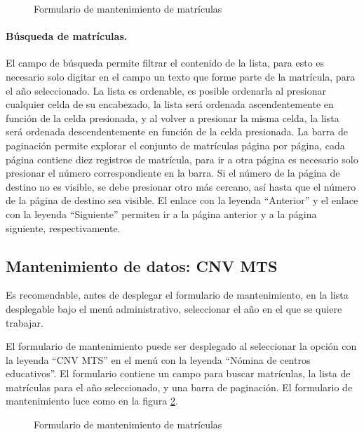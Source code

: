 \documentclass[a4paper, 9pt, conference]{article}              %
\begin{document}
\begin{figure}
	\centering
		\caption{Formulario de mantenimiento de matr\'iculas}
	\label{fig:geoenrollments3}
\end{figure}


\paragraph{B\'usqueda de matr\'iculas.}

El campo de b\'usqueda permite filtrar el contenido de la lista, para esto es necesario solo digitar en el campo un texto que forme parte de la matr\'icula, para el a\~no seleccionado. La lista es ordenable, es posible ordenarla al presionar cualquier celda de su encabezado, la lista ser\'a ordenada ascendentemente en funci\'on de la celda presionada, y al volver a presionar la misma celda, la lista ser\'a ordenada descendentemente en funci\'on de la celda presionada. La barra de paginaci\'on permite explorar el conjunto de matr\'iculas p\'agina por p\'agina, cada p\'agina contiene diez registros de matr\'icula, para ir a otra p\'agina es necesario solo presionar el n\'umero correspondiente en la barra. Si el n\'umero de la p\'agina de destino no es visible, se debe presionar otro m\'as cercano, as\'i hasta que el n\'umero de la p\'agina de destino sea visible. El enlace con la leyenda ``Anterior'' y el enlace con la leyenda ``Siguiente'' permiten ir a la p\'agina anterior y a la p\'agina siguiente, respectivamente.


\subsection{Mantenimiento de datos: CNV MTS}
Es recomendable, antes de desplegar el formulario de mantenimiento, en la lista desplegable bajo el men\'u administrativo, seleccionar el a\~no en el que se quiere trabajar.

El formulario de mantenimiento puede ser desplegado al seleccionar la opci\'on con la leyenda ``CNV MTS'' en el men\'u con la leyenda ``N\'omina de centros educativos''. El formulario contiene un campo para buscar matr\'iculas, la lista de matr\'iculas para el a\~no seleccionado, y una barra de paginaci\'on. El formulario de mantenimiento luce como en la figura \ref{fig:geoenrollments4}.

\begin{figure}
	\centering
		\caption{Formulario de mantenimiento de matr\'iculas}
	\label{fig:geoenrollments4}
\end{figure}
\end{document}
